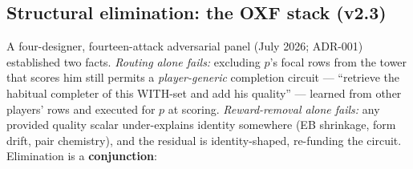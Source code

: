 \documentclass[11pt]{article}
\begin{document}
\subsection{Structural elimination: the OXF stack (v2.3)}
\label{sec:oxf}
A four-designer, fourteen-attack adversarial panel (July 2026; ADR-001)
established two facts. \emph{Routing alone fails:} excluding $p$'s focal rows
from the tower that scores him still permits a \emph{player-generic} completion
circuit --- ``retrieve the habitual completer of this WITH-set and add his
quality'' --- learned from other players' rows and executed for $p$ at scoring.
\emph{Reward-removal alone fails:} any provided quality scalar under-explains
identity somewhere (EB shrinkage, form drift, pair chemistry), and the residual
is identity-shaped, re-funding the circuit. Elimination is a \textbf{conjunction}:
\end{document}
